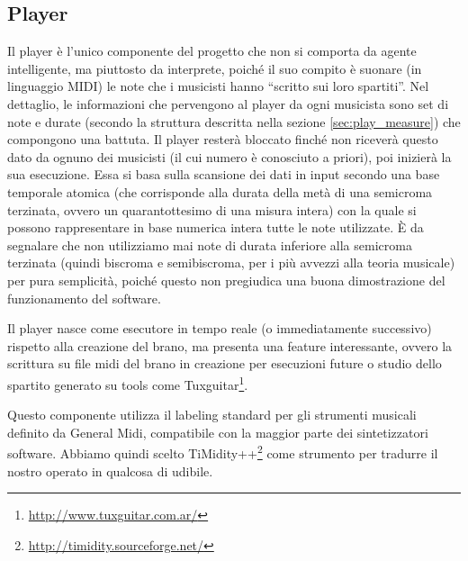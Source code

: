 \subsection{Player}
Il player è l'unico componente del progetto che non si comporta da agente 
intelligente, ma piuttosto da interprete, poiché il suo compito è suonare (in linguaggio MIDI) le note che i musicisti hanno ``scritto sui loro spartiti''.
Nel dettaglio, le informazioni che pervengono al player da ogni 
musicista sono set di note e durate (secondo la struttura descritta nella 
sezione \ref{sec:play_measure}) che compongono una battuta.
Il player resterà bloccato finché non riceverà questo dato da ognuno dei 
musicisti (il cui numero è conosciuto a priori), poi inizierà la sua esecuzione.
Essa si basa sulla scansione dei dati in input secondo una base temporale 
atomica (che corrisponde alla durata della metà di una semicroma terzinata, 
ovvero un quarantottesimo di una misura intera) con la quale si possono 
rappresentare in base numerica intera tutte le note utilizzate.
È da segnalare che non utilizziamo mai note di durata inferiore alla semicroma 
terzinata (quindi biscroma e semibiscroma, per i più avvezzi alla teoria musicale) 
per pura semplicità, poiché questo non pregiudica una buona dimostrazione del 
funzionamento del software.
\newline

Il player nasce come esecutore in tempo reale (o immediatamente successivo) 
rispetto alla creazione del brano, ma presenta una feature interessante, 
ovvero la scrittura su file midi del brano in creazione per esecuzioni future 
o studio dello spartito generato su tools come Tuxguitar\footnote{\url{http://www.tuxguitar.com.ar/}}.

Questo componente utilizza il labeling standard per gli strumenti musicali definito da General Midi\cite{generalmidi}, 
compatibile con la maggior parte dei sintetizzatori software. Abbiamo quindi scelto TiMidity++\footnote{\url{http://timidity.sourceforge.net/}} come strumento per tradurre il nostro operato in qualcosa di udibile.
